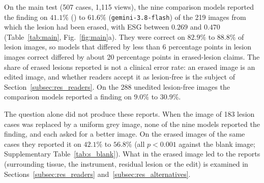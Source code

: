 On the main test (507 cases, 1{,}115 views), the nine comparison models reported the finding on $41.1\%$ (\gem) to $61.6\%$ (\texttt{gemini-3.8-flash}) of the 219 images from which the lesion had been erased, with ESG between $0.269$ and $0.470$ (Table~\ref{tab:main}, Fig.~\ref{fig:main}a).
They were correct on $82.9\%$ to $88.8\%$ of lesion images, so models that differed by less than 6 percentage points in lesion images correct differed by about 20 percentage points in erased-lesion claims.
The share of erased lesions reported is not a clinical error rate: an erased image is an edited image, and whether readers accept it as lesion-free is the subject of Section~\ref{subsec:res_readers}.
On the 288 unedited lesion-free images the comparison models reported a finding on $9.0\%$ to $30.9\%$.

The question alone did not produce these reports.
When the image of 183 lesion cases was replaced by a uniform grey image, none of the nine models reported the finding, and each asked for a better image.
On the erased images of the same cases they reported it on $42.1\%$ to $56.8\%$ (all $p < 0.001$ against the blank image; Supplementary Table~\ref{tab:s_blank}).
What in the erased image led to the reports (surrounding tissue, the instrument, residual lesion or the edit) is examined in Sections~\ref{subsec:res_readers} and~\ref{subsec:res_alternatives}.

